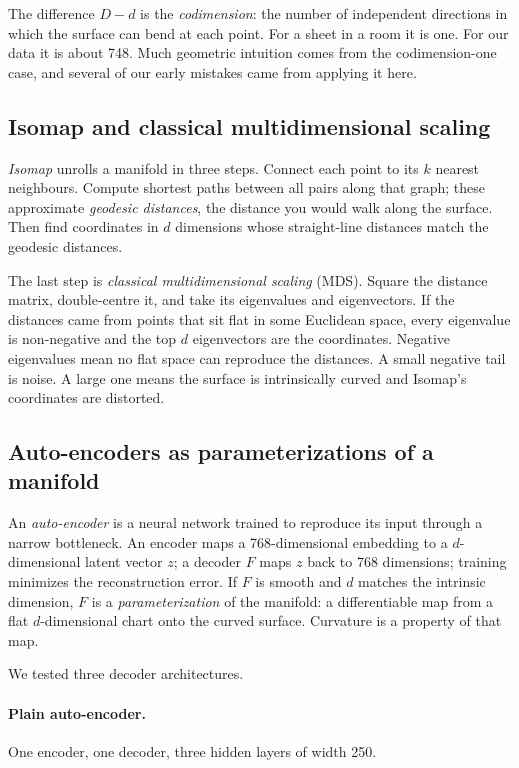 \documentclass[11pt,a4paper]{article}
\begin{document}
The difference $D - d$ is the \emph{codimension}: the number of independent directions in which the surface can bend at each point. For a sheet in a room it is one. For our data it is about 748. Much geometric intuition comes from the codimension-one case, and several of our early mistakes came from applying it here.

\subsection{Isomap and classical multidimensional scaling}

\emph{Isomap} \citep{tenenbaum2000isomap} unrolls a manifold in three steps. Connect each point to its $k$ nearest neighbours. Compute shortest paths between all pairs along that graph; these approximate \emph{geodesic distances}, the distance you would walk along the surface. Then find coordinates in $d$ dimensions whose straight-line distances match the geodesic distances.

The last step is \emph{classical multidimensional scaling} (MDS). Square the distance matrix, double-centre it, and take its eigenvalues and eigenvectors. If the distances came from points that sit flat in some Euclidean space, every eigenvalue is non-negative and the top $d$ eigenvectors are the coordinates. Negative eigenvalues mean no flat space can reproduce the distances. A small negative tail is noise. A large one means the surface is intrinsically curved and Isomap's coordinates are distorted.

\subsection{Auto-encoders as parameterizations of a manifold}

An \emph{auto-encoder} is a neural network trained to reproduce its input through a narrow bottleneck. An encoder maps a 768-dimensional embedding to a $d$-dimensional latent vector $z$; a decoder $F$ maps $z$ back to 768 dimensions; training minimizes the reconstruction error. If $F$ is smooth and $d$ matches the intrinsic dimension, $F$ is a \emph{parameterization} of the manifold: a differentiable map from a flat $d$-dimensional chart onto the curved surface. Curvature is a property of that map.

We tested three decoder architectures.

\paragraph{Plain auto-encoder.} One encoder, one decoder, three hidden layers of width 250.
\end{document}
